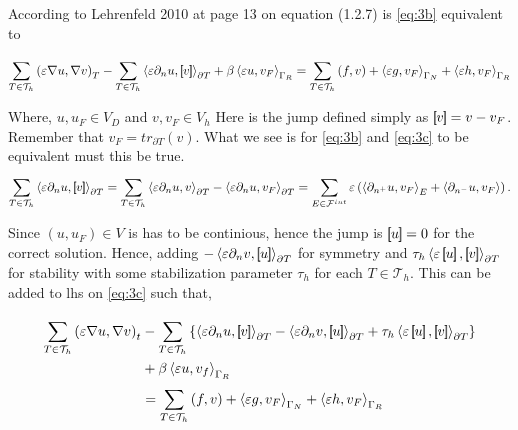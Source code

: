According to Lehrenfeld 2010  \cite{lehrenfeld2010} at page 13 on equation (1.2.7)  is \eqref{eq:3b} equivalent to

\begin{equation}
\label{eq:3c}
\sum_{T \in \mathcal{T} _{h}}^{}   \left( \varepsilon \nabla u, \nabla v \right) _{T} -\sum_{T \in \mathcal{T} _{h}}^{}    \left<\varepsilon  \partial
_{n} u , \left[\!\!\left[  v  \right]\!\!\right] \right> _{\partial T}  + \beta  \left< \varepsilon u, v_{F}  \right>_{\Gamma _{R}} = \sum_{T
\in \mathcal{T} _{h}}^{} \left( f,v \right)  + \left<\varepsilon g, v_{F} \right>_{\Gamma _{N}} + \left<\varepsilon h,
v_{F} \right>_{\Gamma _{R}}
\end{equation}

Where, $u, u_{F} \in V_{D}$ and $v, v_{F} \in V_{h}$
Here is the jump defined simply as $\left[\!\!\left[ v \right]\!\!\right] = v - v_{F}$. Remember that $ v_{F} = tr_{\partial T} \left( v \right)  $. What we see is for \eqref{eq:3b} and \eqref{eq:3c} to be
equivalent must this be true.
\begin{equation}
\label{eq:3c4}
    \sum_{T \in \mathcal{T} _{h}}^{}  \left< \varepsilon \partial _{n} u, \left[\!\!\left[ v \right]\!\!\right]  \right>_{\partial T} = \sum_{T \in
    \mathcal{T} _{h}}^{}  \left< \varepsilon \partial _{n} u, v  \right>_{\partial T} - \left< \varepsilon
    \partial _{n} u, v_{F}  \right>_{\partial T} =\sum_{E \in
    \mathcal{F} ^{int}}^{}  \varepsilon \left( \left< \partial _{n^{+}} u, v_{F} \right>_{E}  + \left<\partial _{n^{-}}
u, v_{F}\right> \right)
.\end{equation}



Since $\left( u, u_{F} \right) \in V $ is has to be continious, hence the jump is $\left[\!\!\left[ u \right]\!\!\right] = 0$ for the correct
solution. Hence,
adding $-\left<\varepsilon \partial _{n} v, \left[\!\!\left[ u \right]\!\!\right] \right>_{\partial T}$ for symmetry and $ \tau _{h} \left<\varepsilon \jump{u},
\jump{v} \right>_{\partial T}$ for stability with some stabilization parameter $\tau _{h}$ for each $T \in
\mathcal{T}_{h} $. This can be added to lhs on \eqref{eq:3c} such that,

\begin{equation}
\label{eq:3c3}
\begin{split}
    \sum_{T \in \mathcal{T} _{h}}^{}   \left( \varepsilon \nabla u, \nabla v \right) _{t} &-\sum_{T \in \mathcal{T} _{h}}^{}
\left\{ \left<\varepsilon  \partial
_{n} u , \jump{ v } \right> _{\partial T}  -\left<\varepsilon
\partial _{n} v, \jump{u} \right>_{\partial T}  + \tau _{h} \left<\varepsilon \jump{u},
\jump{v} \right>_{\partial T} \right\}  \\ &+ \beta  \left< \varepsilon u, v_{f}  \right>_{\Gamma _{R}} \\
                                           &= \sum_{T
\in \mathcal{T} _{h}}^{} \left( f,v \right)  + \left<\varepsilon g, v_{F} \right>_{\Gamma _{N}} + \left<\varepsilon h,
v_{F} \right>_{\Gamma _{R}}
\end{split}
\end{equation}



